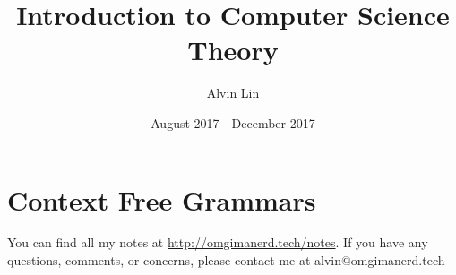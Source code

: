 \documentclass{math}
\title{Introduction to Computer Science Theory}
\author{Alvin Lin}
\date{August 2017 - December 2017}
\begin{document}
\maketitle

\section*{Context Free Grammars}


\begin{center}
  You can find all my notes at \url{http://omgimanerd.tech/notes}. If you have
  any questions, comments, or concerns, please contact me at
  alvin@omgimanerd.tech
\end{center}
\end{document}
